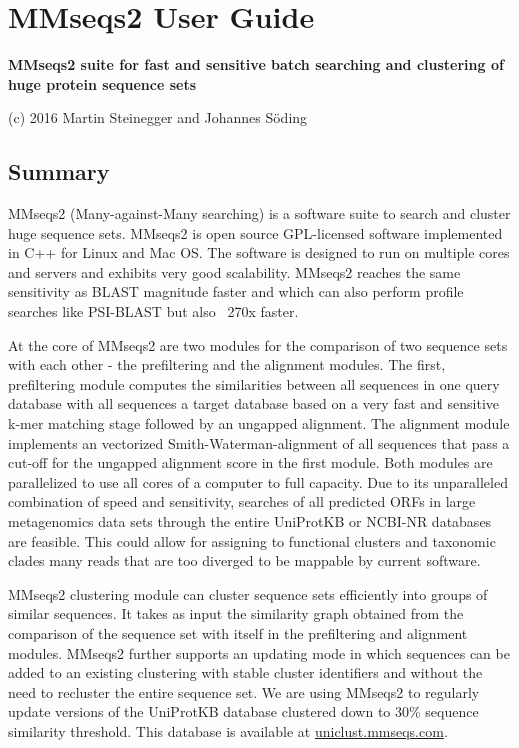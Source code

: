 \documentclass[11pt,a4paper]{scrreprt}
\begin{document}
\chapter*{MMseqs2 User Guide}
\renewcommand*\thesection{\arabic{section}}

\textbf{MMseqs2 suite for fast and sensitive batch searching and clustering of huge protein sequence sets}

(c) 2016 Martin Steinegger and Johannes S\"oding
\section{Summary}

MMseqs2 (Many-against-Many searching) is a software suite to search and cluster huge sequence sets. MMseqs2 is open source GPL-licensed software implemented in C++ for Linux and Mac OS. The software is designed to run on multiple cores and servers and exhibits very good scalability. MMseqs2 reaches the same sensitivity as BLAST magnitude faster and which can also perform profile searches like PSI-BLAST but also ~270x faster.

At the core of MMseqs2 are two modules for the comparison of two sequence sets with each other - the prefiltering and the alignment modules. The first, prefiltering module computes the similarities between all sequences in one query database with all sequences a target database based on a very fast and sensitive k-mer matching stage followed by an ungapped alignment. The alignment module implements an vectorized Smith-Waterman-alignment of all sequences that pass a cut-off for the ungapped alignment score in the first module. Both modules are parallelized to use all cores of a computer to full capacity. Due to its unparalleled combination of speed and sensitivity, searches of all predicted ORFs in large metagenomics data sets through the entire UniProtKB or NCBI-NR databases are feasible. This could allow for assigning to functional clusters and taxonomic clades many reads that are too diverged to be mappable by current software.

MMseqs2 clustering module can cluster sequence sets efficiently into groups of similar sequences. It takes as input the similarity graph obtained from the comparison of the sequence set with itself in the prefiltering and alignment modules. MMseqs2 further supports an updating mode in which sequences can be added to an existing clustering with stable cluster identifiers and without the need to recluster the entire sequence set. We are using MMseqs2 to regularly update versions of the UniProtKB database clustered down to 30\% sequence similarity threshold. This database is available at \href{https://uniclust.mmseqs.com}{uniclust.mmseqs.com}.
\end{document}
